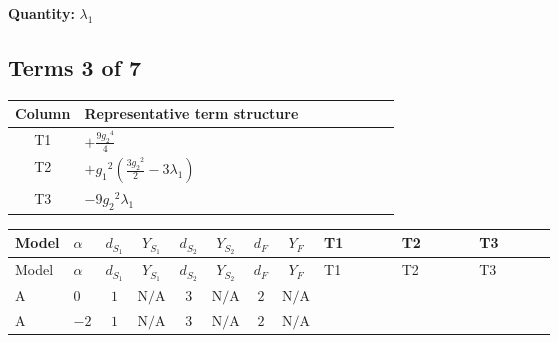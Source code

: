 \documentclass[8pt]{article}
\begin{document}
\begin{landscape}
\begin{longtable}{@{}llcccccc >{\raggedright\arraybackslash}p{0.21\linewidth} >{\raggedright\arraybackslash}p{0.21\linewidth} >{\raggedright\arraybackslash}p{0.21\linewidth}@{}}
\midrule
\bottomrule
\end{longtable}
\clearpage
\noindent\textbf{Quantity: }$\lambda_1$\par\smallskip
\subsection*{Terms 3 of 7}
\begin{center}
\begin{tabular}{@{}c >{\raggedright\arraybackslash}p{0.82\linewidth}@{}}
\toprule
Column & Representative term structure \\
\midrule
T1 & \(\displaystyle +\frac{9 {g_2}^4}{4}\) \\
\midrule
T2 & \(\displaystyle +{g_1}^2 \left(\frac{3 {g_2}^2}{2}-3 {\lambda_1}\right)\) \\
\midrule
T3 & \(\displaystyle -9 {g_2}^2 {\lambda_1}\) \\
\midrule
\bottomrule
\end{tabular}
\end{center}
\smallskip
\tiny
\begin{longtable}{@{}llcccccc >{\raggedright\arraybackslash}p{0.21\linewidth} >{\raggedright\arraybackslash}p{0.21\linewidth} >{\raggedright\arraybackslash}p{0.21\linewidth}@{}}
\toprule
Model & $\alpha$ & $d_{S_1}$ & $Y_{S_1}$ & $d_{S_2}$ & $Y_{S_2}$ & $d_F$ & $Y_F$ & T1 & T2 & T3 \\
\midrule
\endfirsthead
\toprule
Model & $\alpha$ & $d_{S_1}$ & $Y_{S_1}$ & $d_{S_2}$ & $Y_{S_2}$ & $d_F$ & $Y_F$ & T1 & T2 & T3 \\
\midrule
\endhead
A & $0$ & $1$ & $\text{N/A}$ & $3$ & $\text{N/A}$ & $2$ & $\text{N/A}$ & \scriptsize\adjustbox{max width=\linewidth}{$\begin{gathered} +\frac{9 {g_2}^4}{4}\end{gathered}$} & \scriptsize\adjustbox{max width=\linewidth}{$\begin{gathered} +{g_1}^2 \left(\frac{3 {g_2}^2}{2}-3 {\lambda_1}\right)\end{gathered}$} & \scriptsize\adjustbox{max width=\linewidth}{$\begin{gathered} -9 {g_2}^2 {\lambda_1}\end{gathered}$} \\
\midrule
A & $-2$ & $1$ & $\text{N/A}$ & $3$ & $\text{N/A}$ & $2$ & $\text{N/A}$ & \scriptsize\adjustbox{max width=\linewidth}{$\begin{gathered} +\frac{9 {g_2}^4}{4}\end{gathered}$} & \scriptsize\adjustbox{max width=\linewidth}{$\begin{gathered} +{g_1}^2 \left(\frac{3 {g_2}^2}{2}-3 {\lambda_1}\right)\end{gathered}$} & \scriptsize\adjustbox{max width=\linewidth}{$\begin{gathered} -9 {g_2}^2 {\lambda_1}\end{gathered}$} \\

\end{longtable}
\end{landscape}
\end{document}
